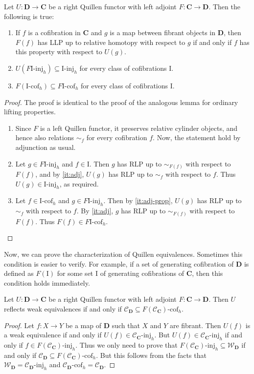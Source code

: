 \documentclass{tac}
\theoremstyle{definition}
\newcommand{\we}{\mathcal{W}}
\newcommand{\cof}{\mathcal{C}}
\newcommand{\cat}[1]{\mathbf{#1}}
\newcommand{\C}{\cat{C}}
\newcommand{\D}{\cat{D}}
\newcommand{\I}{\mathrm{I}}
\newcommand{\class}[2]{#1\text{-}\mathrm{#2}}
\newcommand{\Iinj}[1][\I]{\class{#1}{inj}}
\newcommand{\Icof}[1][\I]{\class{#1}{cof}}
\begin{document}
\begin{lem}
Let $U : \D \to \C$ be a right Quillen functor with left adjoint $F : \C \to \D$.
Then the following is true:
\begin{enumerate}
\item \label{it:adj} If $f$ is a cofibration in $\C$ and $g$ is a map between fibrant objects in $\D$,
then $F(f)$ has LLP up to relative homotopy with respect to $g$ if and only if $f$ has this property with respect to $U(g)$.
\item \label{it:adj-prop} $U(\Iinj[F\I]_h) \subseteq \Iinj_h$ for every class of cofibrations $\I$.
\item $F(\Icof_h) \subseteq \Icof[F\I]_h$ for every class of cofibrations $\I$.
\end{enumerate}
\end{lem}
\begin{proof}
The proof is identical to the proof of the analogous lemma for ordinary lifting properties.
\begin{enumerate}
\item Since $F$ is a left Quillen functor, it preserves relative cylinder objects, and hence also relations $\sim_f$ for every cofibration $f$.
Now, the statement hold by adjunction as usual.
\item Let $g \in \Iinj[F\I]_h$ and $f \in \I$.
Then $g$ has RLP up to $\sim_{F(f)}$ with respect to $F(f)$, and by \eqref{it:adj}, $U(g)$ has RLP up to $\sim_f$ with respect to $f$.
Thus $U(g) \in \Iinj_h$, as required.
\item Let $f \in \Icof_h$ and $g \in \Iinj[F\I]_h$.
Then by \eqref{it:adj-prop}, $U(g)$ has RLP up to $\sim_f$ with respect to $f$.
By \eqref{it:adj}, $g$ has RLP up to $\sim_{F(f)}$ with respect to $F(f)$.
Thus $F(f) \in \Icof[F\I]_h$.
\end{enumerate}
\end{proof}

Now, we can prove the characterization of Quillen equivalences.
Sometimes this condition is easier to verify.
For example, if a set of generating cofibration of $\D$ is defined as $F(\I)$ for some set $\I$ of generating cofibrations of $\C$, then this condition holds immediately.

\begin{prop}
Let $U : \D \to \C$ be a right Quillen functor with left adjoint $F : \C \to \D$.
Then $U$ reflects weak equivalences if and only if $\cof_\D \subseteq \Icof[F(\cof_\C)]_h$.
\end{prop}
\begin{proof}
Let $f : X \to Y$ be a map of $\D$ such that $X$ and $Y$ are fibrant.
Then $U(f)$ is a weak equivalence if and only if $U(f) \in \Iinj[\cof_\C]_h$.
But $U(f) \in \Iinj[\cof_\C]_h$ if and only if $f \in \Iinj[F(\cof_\C)]_h$.
Thus we only need to prove that $\Iinj[F(\cof_\C)]_h \subseteq \we_\D$ if and only if $\cof_\D \subseteq \Icof[F(\cof_\C)]_h$.
But this follows from the facts that $\we_\D = \Iinj[\cof_\D]_h$ and $\Icof[\cof_\D]_h = \cof_\D$.
\end{proof}
\end{document}
